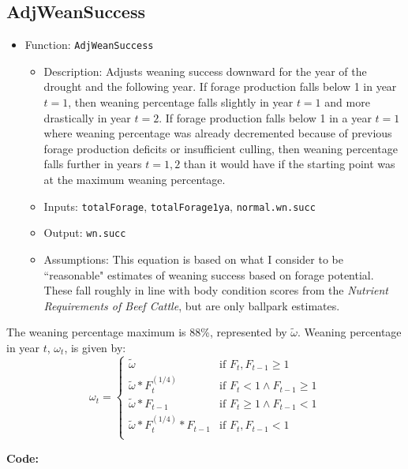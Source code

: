\documentclass[11pt]{article}
\begin{document}
\subsection{AdjWeanSuccess}
\begin{itemize}
\item Function: \verb!AdjWeanSuccess!
	\begin{itemize}
	\item Description: Adjusts weaning success downward for the year of the drought and the following year. If forage production falls below 1 in year $t=1$, then weaning percentage falls slightly in year $t=1$ and more drastically in year $t=2$. If forage production falls below 1 in a year $t=1$ where weaning percentage was already decremented because of previous forage production deficits or insufficient culling, then weaning percentage falls further in years $t=1,2$ than it would have if the starting point was at the maximum weaning percentage.
	\item Inputs: \verb!totalForage!, \verb!totalForage1ya!, \verb!normal.wn.succ!
	\item Output: \verb!wn.succ!
	\item Assumptions: This equation is based on what I consider to be ``reasonable" estimates of weaning success based on forage potential. These fall roughly in line with body condition scores from the \textit{Nutrient Requirements of Beef Cattle}, but are only ballpark estimates.
	\end{itemize}
\end{itemize}

The weaning percentage maximum is 88\%, represented by $\tilde{\omega}$. Weaning percentage in year $t$, $\omega_t$, is given by:\\

\begin{equation}
\omega_t =
\begin{cases}
\tilde{\omega}  &\text{if } F_{t}, F_{t-1} \ge 1  \\
\tilde{\omega} * F_{t}^{(1/4)} &\text{if } F_{t} < 1 \land F_{t-1} \ge 1 \\
\tilde{\omega} * F_{t - 1} &\text{if } F_{t} \ge 1 \land F_{t-1} < 1 \\
\tilde{\omega} * F_{t}^{(1/4)} * F_{t-1} &\text{if } F_{t}, F_{t-1} < 1 \\
\end{cases}
\end{equation}

\vspace{.25in}
\textbf{Code:}
\end{document}
